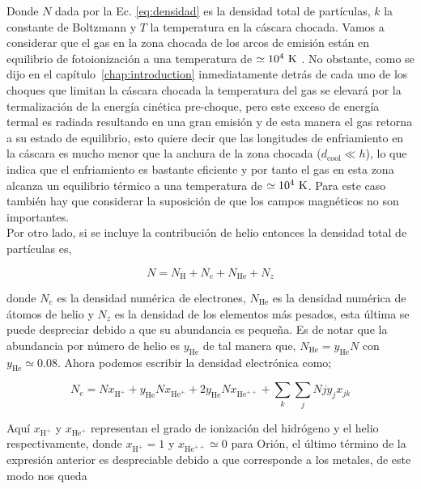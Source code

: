 Donde \(N\) dada por la Ec. \ref{eq:densidad} es la densidad total de partículas, \(k\) la constante de Boltzmann y \(T\) la temperatura en la cáscara chocada. Vamos a considerar que el gas en la zona chocada de los arcos de emisión están en equilibrio de fotoionización a una temperatura  de  \(\simeq10^{4}~\mathrm{K}\) \citep{Henney:2002, Henney:2002a}. No obstante, como se dijo en el capítulo~\ref{chap:introduction} inmediatamente detrás de cada uno de los choques que limitan la cáscara chocada la temperatura del gas se elevará por la termalización de la energía cinética pre-choque, pero este exceso de energía termal es radiada resultando en  una gran emisión y de esta manera el gas retorna a su estado de equilibrio, esto quiere decir que las longitudes de enfriamiento en la cáscara es mucho menor que la anchura de la zona chocada (\(d_{\text{cool}} \ll h\)), lo que indica que el  enfriamiento es bastante  eficiente y por tanto el gas en esta zona alcanza un equilibrio térmico a una temperatura de  \(\simeq10^{4}~\mathrm{K}\). Para este caso también hay que considerar la suposición de que los campos magnéticos no son importantes.\\

Por otro lado, si se incluye la contribución de helio entonces la densidad total de partículas es,

\begin{equation*}
  \label{eq:particulas}
  N = N_{\text{H}} + N_{e} + N_{\text{He}} + N_{z}
\end{equation*}

donde \(N_{e}\) es la densidad numérica de electrones, \(N_{\text{He}}\) es la densidad numérica de átomos de helio y \(N_{z}\) es la densidad de los elementos más pesados, esta última se puede despreciar debido a que su abundancia es pequeña. Es de notar que la abundancia por número de helio es \(y_{\text{He}}\) de tal manera que, \(N_{\text{He}} = y_{\text{He}} N\) con \(y_{\text{He}} \simeq 0.08\). Ahora podemos escribir la densidad electrónica como;

\begin{equation*}
  \label{eq:densidad-electronica}
  N_{e}=Nx_{\text{H}^{+}} + y_{\text{He}}Nx_{\text{He}^{+}} + 2 y_{\text{He}}Nx_{\text{He}^{++}} + \sum_{k} \sum_{j}Njy_{j}x_{jk}
\end{equation*}

Aquí \(x_{\text{H}^{+}}\) y \(x_{\text{He}^{+}}\) representan el grado de ionización del hidrógeno y el helio respectivamente, donde \(x_{\text{H}^{+}}=1\) y \(x_{\text{He}^{++}} \simeq 0\) para Orión, el último término de la expresión anterior es despreciable debido a que corresponde a los metales, de este modo nos queda

